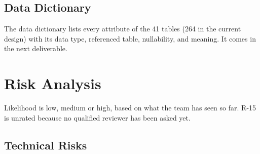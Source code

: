 \documentclass{FastFyp}
\begin{document}
\subsection{Data Dictionary}
The data dictionary lists every attribute of the 41 tables (264 in the current design) with its data type, referenced table, nullability, and meaning. It comes in the next deliverable.

\section{Risk Analysis}
Likelihood is low, medium or high, based on what the team has seen so far. R-15 is unrated because no qualified reviewer has been asked yet.

\subsection{Technical Risks}
\end{document}
